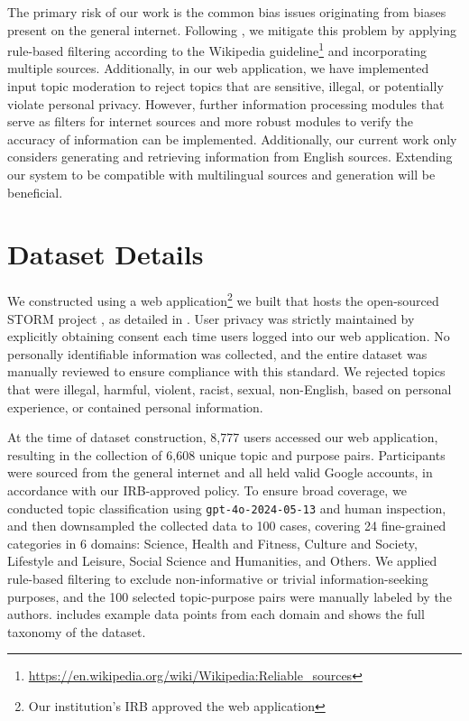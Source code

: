\documentclass[11pt]{article}
\begin{document}
The primary risk of our work is the common bias issues originating from biases present on the general internet. Following \citet{shao2024assisting}, we mitigate this problem by applying rule-based filtering according to the Wikipedia guideline\footnote{\url{https://en.wikipedia.org/wiki/Wikipedia:Reliable_sources}} and incorporating multiple sources. Additionally, in our web application, we have implemented input topic moderation to reject topics that are sensitive, illegal, or potentially violate personal privacy. However, further information processing modules that serve as filters for internet sources and more robust modules to verify the accuracy of information can be implemented. Additionally, our current work only considers generating and retrieving information from English sources. Extending our system to be compatible with multilingual sources and generation will be beneficial.




%

\clearpage
\appendix

\section{Dataset Details}
\label{appendix:dataset}
We constructed \data using a web application\footnote{Our institution's IRB approved the web application} we built that hosts the open-sourced STORM project \citep{shao2024assisting}, as detailed in . User privacy was strictly maintained by explicitly obtaining consent each time users logged into our web application. No personally identifiable information was collected, and the entire dataset was manually reviewed to ensure compliance with this standard. We rejected topics that were illegal, harmful, violent, racist, sexual, non-English, based on personal experience, or contained personal information.

At the time of dataset construction, 8,777 users accessed our web application, resulting in the collection of 6,608 unique topic and purpose pairs. Participants were sourced from the general internet and all held valid Google accounts, in accordance with our IRB-approved policy. To ensure broad coverage, we conducted topic classification using \texttt{gpt-4o-2024-05-13} and human inspection, and then downsampled the collected data to 100 cases, covering 24 fine-grained categories in 6 domains: Science, Health and Fitness, Culture and Society, Lifestyle and Leisure, Social Science and Humanities, and Others. We applied rule-based filtering to exclude non-informative or trivial information-seeking purposes, and the 100 selected topic-purpose pairs were manually labeled by the authors.  includes example data points from each domain and  shows the full taxonomy of the \data dataset.
\end{document}

